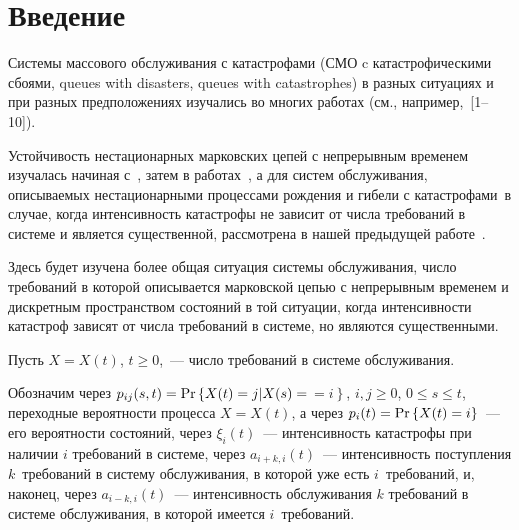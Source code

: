       \begin{multicols}{2}
      
            \label{st\stat}

\section{Введение}

Системы массового обслуживания с катастрофами (СМО c катастрофическими сбоями, 
queues with disasters, queues with catastrophes) в разных ситуациях и при разных 
предположениях изучались во многих работах 
(см., например,~[1--10]).

Устойчивость нестационарных марковских цепей  с непрерывным временем изучалась начиная 
с~\cite{z85}, затем в работах~\cite{z98, ae}, а для систем обслуживания, описываемых 
нестационарными процессами рождения и гибели  
с катастрофами~в случае, когда интенсивность катастрофы не 
зави\-сит от числа требований в системе и является существенной, рассмотрена в 
нашей предыдущей работе~\cite{z10}.
{

}

Здесь будет изучена более общая ситуация сис\-те\-мы обслуживания, чис\-ло 
требований в которой описывается марковской цепью с непрерывным временем 
и дискретным пространством состояний в той ситуации, когда интенсивности 
катастроф  зависят от числа требований в системе, но являются существенными.

Пусть $X=X(t)$, $t\geq 0$,~--- чис\-ло требований в сис\-те\-ме обслуживания.

Обозначим через $p_{ij}(s,t)\hm=\mathrm{Pr}\left\{ X(t)\hm=j\vert X(s)=\right.$\linebreak $\left.=i
\right\}$, $i,j \ge 0$, $0\leq s\leq t$, переходные вероятности
процесса $X=X(t)$, а через  $p_i(t)=\mathrm{Pr}\left\{ X(t) \hm=i \right\}$~---
его вероятности со\-сто\-яний, через $\xi_i(t)$~--- интенсивность катастрофы при наличии 
$i$ требований в сис\-те\-ме, через $a_{i+k,i}(t)$~--- интенсивность поступления 
$k$~требований в сис\-те\-му обслуживания, в которой уже есть  $i$~требований, и, 
наконец, через  $a_{i-k,i}(t)$~--- интенсивность обслуживания $k$ требований в сис\-те\-ме 
обслуживания, в которой имеется  $i$~требований.


\end{multicols}
